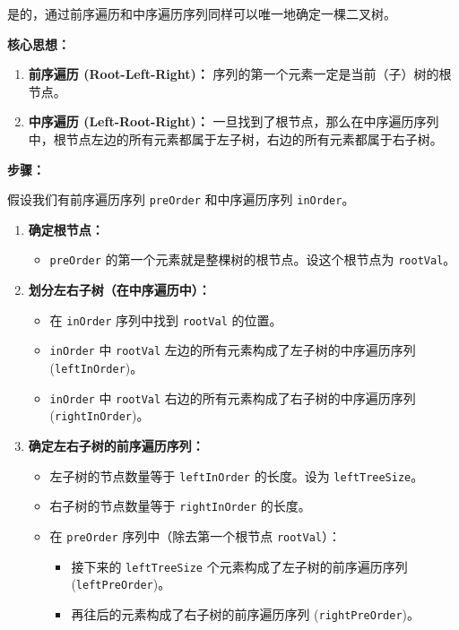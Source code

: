 是的，通过前序遍历和中序遍历序列同样可以唯一地确定一棵二叉树。

\textbf{核心思想：}

\begin{enumerate}
	\item \textbf{前序遍历 (Root-Left-Right)：} 序列的第一个元素一定是当前（子）树的根节点。
	\item \textbf{中序遍历 (Left-Root-Right)：} 一旦找到了根节点，那么在中序遍历序列中，根节点左边的所有元素都属于左子树，右边的所有元素都属于右子树。
\end{enumerate}

\textbf{步骤：}

假设我们有前序遍历序列 \lstinline{preOrder} 和中序遍历序列 \lstinline{inOrder}。

\begin{enumerate}
	\item \textbf{确定根节点：}
	\begin{itemize}
		\item \lstinline{preOrder} 的第一个元素就是整棵树的根节点。设这个根节点为 \lstinline{rootVal}。
	\end{itemize}
	\item \textbf{划分左右子树（在中序遍历中）：}
	\begin{itemize}
		\item 在 \lstinline{inOrder} 序列中找到 \lstinline{rootVal} 的位置。
		\item \lstinline{inOrder} 中 \lstinline{rootVal} 左边的所有元素构成了左子树的中序遍历序列 (\lstinline{leftInOrder})。
		\item \lstinline{inOrder} 中 \lstinline{rootVal} 右边的所有元素构成了右子树的中序遍历序列 (\lstinline{rightInOrder})。
	\end{itemize}
	\item \textbf{确定左右子树的前序遍历序列：}
	\begin{itemize}
		\item 左子树的节点数量等于 \lstinline{leftInOrder} 的长度。设为 \lstinline{leftTreeSize}。
		\item 右子树的节点数量等于 \lstinline{rightInOrder} 的长度。
		\item 在 \lstinline{preOrder} 序列中（除去第一个根节点 \lstinline{rootVal}）：
		\begin{itemize}
			\item 接下来的 \lstinline{leftTreeSize} 个元素构成了左子树的前序遍历序列 (\lstinline{leftPreOrder})。
			\item 再往后的元素构成了右子树的前序遍历序列 (\lstinline{rightPreOrder})。

\end{itemize}
\end{itemize}
\end{enumerate}

